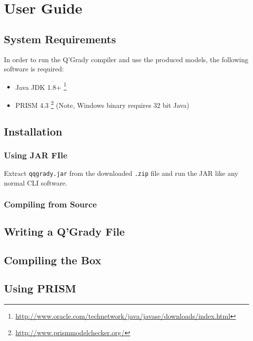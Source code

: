 \documentclass[report.tex]{subfiles}
\begin{document}
\chapter{User Guide} %
\label{cha:user_guide}
\section{System Requirements} %
\label{sec:system_requirements}
In order to run the Q'Grady compiler and use the produced models, the following
software is required:

\begin{itemize}
    \item Java JDK 1.8+ \footnote{\url{http://www.oracle.com/technetwork/java/javase/downloads/index.html}}
    \item PRISM 4.3 \footnote{\url{http://www.prismmodelchecker.org/}} (Note, Windows binary requires 32 bit Java)
\end{itemize}

\section{Installation} %
\label{sec:installation}
\subsection{Using JAR FIle} %
\label{sub:using_jar_file}
Extract \texttt{qqgrady.jar} from the downloaded \texttt{.zip} file and run the
JAR like any normal CLI software.

\subsection{Compiling from Source} %
\label{sub:compiling_from_source}


\section{Writing a Q'Grady File} %
\label{sec:writing_a_q_grady_file}

\section{Compiling the Box} %
\label{sec:compiling_the_box}


\section{Using PRISM} %
\label{sec:using_prism}


\newpage
\end{document}
